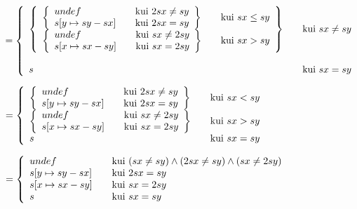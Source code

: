 \(
= 
\left\{
  \begin{array}{l l}
  \left\{
    \begin{array}{l l}
    \left\{
      \begin{array}{l l}
        undef & \quad \text{kui}\ 2sx \neq sy \\
        s[y \mapsto sy - sx] & \quad \text{kui}\ 2sx = sy
      \end{array}
    \right\} & \quad \text{kui}\ sx \leq sy
    \\
    \left\{
      \begin{array}{l l}
        undef & \quad \text{kui}\ sx \neq 2sy \\
        s[x \mapsto sx - sy] & \quad \text{kui}\ sx = 2sy\\
      \end{array}
    \right\} & \quad \text{kui}\ sx > sy
    \end{array}
  \right\}
  &  \quad \text{kui}\ sx \neq sy \\
  \\
  s   & \quad \text{kui}\ sx = sy\\
  \end{array}
\right.
\)

\(
= 
\left\{ \begin{array}{l l}
    \left\{ \begin{array}{l l}
        undef & \quad \text{kui}\ 2sx \neq sy \\
        s[y \mapsto sy - sx] & \quad \text{kui}\ 2sx = sy
    \end{array} \right\} & \quad \text{kui}\ sx < sy
    \\
    \left\{ \begin{array}{l l}
        undef & \quad \text{kui}\ sx \neq 2sy \\
        s[x \mapsto sx - sy] & \quad \text{kui}\ sx = 2sy\\
    \end{array} \right\} & \quad \text{kui}\ sx > sy
  \\
  s
  & \quad \text{kui}\ sx = sy\\
  \end{array} \right.
\)

\(
= 
\left\{
  \begin{array}{l l}
  undef                & \quad \text{kui}\ (sx \neq sy) \wedge (2sx \neq sy) \wedge (sx \neq 2sy)\\
  s[y \mapsto sy - sx] & \quad \text{kui}\ 2sx = sy \\
  s[x \mapsto sx - sy] & \quad \text{kui}\ sx = 2sy \\
  s                    & \quad \text{kui}\ sx = sy\\
  \end{array}
\right.
\)

